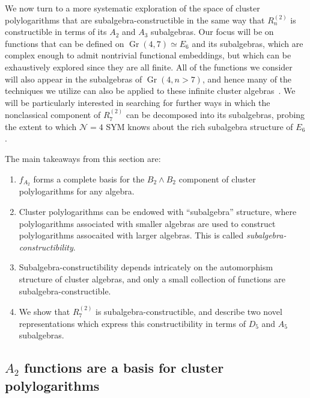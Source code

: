 \documentclass[11pt]{article}
\DeclareMathOperator{\Gr}{Gr}
\def\pdfeq#1{\texorpdfstring{$#1$}{a}}
\begin{document}
We now turn to a more systematic exploration of the space of cluster polylogarithms that are subalgebra-constructible in the same way that $R_n^{(2)}$ is constructible in terms of its $A_2$ and $A_3$ subalgebras. Our focus will be on functions that can be defined on $\Gr(4,7) \simeq E_6$ and its subalgebras, which are complex enough to admit nontrivial functional embeddings, but which can be exhaustively explored since they are all finite. All of the functions we consider will also appear in the subalgebras of $\Gr(4,n>7)$, and hence many of the techniques we utilize can also be applied to these infinite cluster algebras~\cite{Golden:2014xqa,cluster_subalgebras_ii}. We will be particularly interested in searching for further ways in which the nonclassical component of $R^{(2)}_{7}$ can be decomposed into its subalgebras, probing the extent to which $\mathcal{N}=4$ SYM knows about the rich subalgebra structure of $E_6$. 


\newpage 

The main takeaways from this section are:
\begin{enumerate}
	\item $f_{A_2}$ forms a complete basis for the $B_2 \wedge B_2$ component of cluster polylogarithms for any algebra. 
	\item Cluster polylogarithms can be endowed with ``subalgebra'' structure, where polylogarithms associated with smaller algebras are used to construct polylogarithms assocaited with larger algebras. This is called \emph{subalgebra-constructibility}.
	\item Subalgebra-constructibility depends intricately on the automorphism structure of cluster algebras, and only a small collection of functions are subalgebra-constructible. 
	\item We show that $R^{(2)}_7$ is subalgebra-constructible, and describe two novel representations which express this constructibility in terms of $D_5$ and $A_5$ subalgebras. 
\end{enumerate}

\subsection{\pdfeq{A_2} functions are a basis for cluster polylogarithms}
\end{document}
